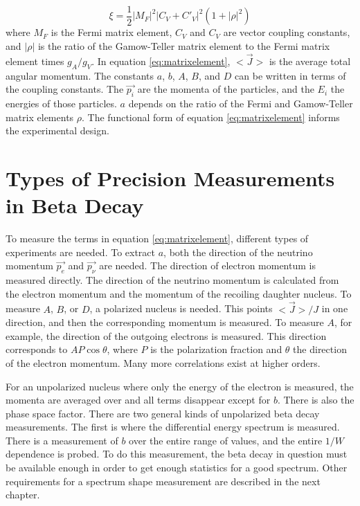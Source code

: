 \documentclass[../MaxHughesThesis.tex]{subfiles}
\begin{document}
\begin{equation}
	\xi = \frac{1}{2} |M_{F}|^{2} |C_{V} + C'_{V}|^{2} (1 + |\rho|^{2})
	\label{eq:xiwrittenout}
\end{equation}
where $M_{F}$ is the Fermi matrix element, $C_{V}$ and $C_{V}$ are vector coupling constants, and $|\rho|$ is the ratio of the Gamow-Teller matrix element to the Fermi matrix element times $g_{A}/g_{V}$.
In equation \ref{eq:matrixelement}, $<\vec{J}>$ is the average total angular momentum. 
The constants $a$, $b$, $A$, $B$, and $D$ can be written in terms of the coupling constants.
The $\vec{p_{i}}$ are the momenta of the particles, and the $E_{i}$ the energies of those particles.
$a$ depends on the ratio of the Fermi and Gamow-Teller matrix elements $\rho$.
The functional form of equation \ref{eq:matrixelement} informs the experimental design.

\section{Types of Precision Measurements in Beta Decay}
To measure the terms in equation \ref{eq:matrixelement}, different types of experiments are needed.
To extract $a$, both the direction of the neutrino momentum $\vec{p_{e}}$ and $\vec{p_{\nu}}$ are needed.  
The direction of electron momentum is measured directly. 
The direction of the neutrino momentum is calculated from the electron momentum and the momentum of the recoiling daughter nucleus. 
To measure $A$, $B$, or $D$, a polarized nucleus is needed.
This points $<\vec{J}>/J$ in one direction, and then the corresponding momentum is measured.
To measure $A$, for example, the direction of the outgoing electrons is measured.
This direction corresponds to $AP\cos{\theta}$, where $P$ is the polarization fraction and $\theta$ the direction of the electron momentum.
Many more correlations exist at higher orders.

For an unpolarized nucleus where only the energy of the electron is measured, the momenta are averaged over and all terms disappear except for $b$.
There is also the phase space factor.
There are two general kinds of unpolarized beta decay measurements.
The first is where the differential energy spectrum is measured.
There is a measurement of $b$ over the entire range of values, and the entire $1/W$ dependence is probed.
To do this measurement, the beta decay in question must be available enough in order to get enough statistics for a good spectrum.
Other requirements for a spectrum shape measurement are described in the next chapter.
\end{document}

